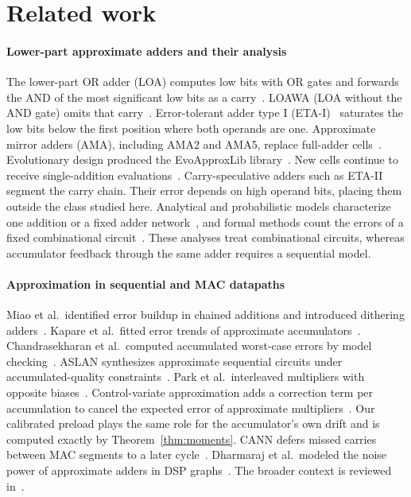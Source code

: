\documentclass[preprint,12pt,numbers]{elsarticle}
\theoremstyle{definition}
\begin{document}
\section{Related work}
\label{sec:related}

\paragraph{Lower-part approximate adders and their analysis}
The lower-part OR adder (LOA) computes low bits with OR gates and
forwards the AND of the most significant low bits as a
carry~\cite{mahdiani2010loa}. LOAWA (LOA without the AND gate) omits
that carry~\cite{albicocco2012loawa}. Error-tolerant adder type I
(ETA-I)~\cite{zhu2010eta} saturates the low
bits below the first position where both operands are one.
Approximate mirror adders (AMA), including AMA2 and AMA5, replace
full-adder cells~\cite{gupta2013ama}.
Evolutionary design produced the EvoApproxLib library~\cite{mrazek2017evoapprox}.
New cells continue to receive single-addition
evaluations~\cite{echavarria2017aer,huang2026sfe}. Carry-speculative adders
such as ETA-II~\cite{zhu2009eta} segment the carry chain. Their error
depends on high operand bits, placing them outside the class studied here.
Analytical and probabilistic models characterize one addition or a fixed
adder network~\cite{liang2013metrics,liu2015analytical,mazahir2017probabilistic,li2014errormodel,ayub2017statistical,ayub2021peal,hanif2020pemacx,hanif2023daem,hanif2024dreamx},
and formal methods count the errors of a fixed combinational
circuit~\cite{venkatesan2011macaco,abed2020satmetrics,meng2024vacsem,ramprasath2026mcac}.
These analyses treat combinational circuits, whereas accumulator feedback
through the same adder requires a sequential model.

\paragraph{Approximation in sequential and MAC datapaths}
Miao et al.\ identified error buildup in chained additions and introduced
dithering adders~\cite{miao2012dither}. Kapare et al.\ fitted error
trends of approximate accumulators~\cite{kapare2016seq}.
Chandrasekharan et al.\ computed accumulated worst-case errors by model
checking~\cite{chandrasekharan2016seq}. ASLAN synthesizes approximate
sequential circuits under accumulated-quality
constraints~\cite{ranjan2014aslan}. Park et al.\ interleaved multipliers with
opposite biases~\cite{park2021mac}. Control-variate approximation adds a
correction term per accumulation to cancel the expected error of approximate
multipliers~\cite{zervakis2021cv}. Our calibrated preload plays the same role
for the accumulator's own drift and is computed exactly by
Theorem~\ref{thm:moments}. CANN defers missed carries between MAC segments to
a later cycle~\cite{cann_curable}. Dharmaraj et al.\ modeled the noise
power of approximate adders in DSP graphs~\cite{dharmaraj2021parameterized}.
The broader context is reviewed in~\cite{leon2025survey}.
\end{document}
